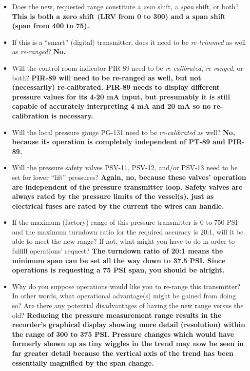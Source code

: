 \documentclass[12pt,a4paper]{article}
\begin{document}
\begin{itemize}
\item{} Does the new, requested range constitute a {\it zero} shift, a {\it span} shift, or both?  {\bf This is both a zero shift (LRV from 0 to 300) and a span shift (span from 400 to 75).}
\vskip 10pt
\item{} If this is a ``smart'' (digital) transmitter, does it need to be {\it re-trimmed} as well as {\it re-ranged}?  {\bf No.}
\vskip 10pt
\item{} Will the control room indicator PIR-89 need to be {\it re-calibrated}, {\it re-ranged}, or both? {\bf PIR-89 will need to be re-ranged as well, but not (necessarily) re-calibrated.  PIR-89 needs to display different pressure values for its 4-20 mA input, but presumably it is still capable of accurately interpreting 4 mA and 20 mA so no re-calibration is necessary.}
\vskip 10pt
\item{} Will the local pressure gauge PG-131 need to be {\it re-calibrated} as well?  {\bf No, because its operation is completely independent of PT-89 and PIR-89.}
\vskip 10pt
\item{} Will the pressure safety valves PSV-11, PSV-12, and/or PSV-13 need to be set for lower ``lift'' pressures? {\bf Again, no, because these valves' operation are independent of the pressure transmitter loop.  Safety valves are always rated by the pressure limits of the vessel(s), just as electrical fuses are rated by the current the wires can handle.}
\vskip 10pt
\item{} If the maximum (factory) range of this pressure transmitter is 0 to 750 PSI and the maximum turndown ratio for the required accuracy is 20:1, will it be able to meet the new range?  If not, what might you have to do in order to fulfill operations' request? {\bf The turndown ratio of 20:1 means the minimum span can be set all the way down to 37.5 PSI.  Since operations is requesting a 75 PSI span, you should be alright.}
\vskip 10pt
\item{} Why do you suppose operations would like you to re-range this transmitter?  In other words, what operational advantage(s) might be gained from doing so?  Are there any potential disadvantages of having the new range versus the old? {\bf Reducing the pressure measurement range results in the recorder's graphical display showing more detail (resolution) within the range of 300 to 375 PSI.  Pressure changes which would have formerly shown up as tiny wiggles in the trend may now be seen in far greater detail because the vertical axis of the trend has been essentially magnified by the span change.}
\end{itemize}
\end{document}
